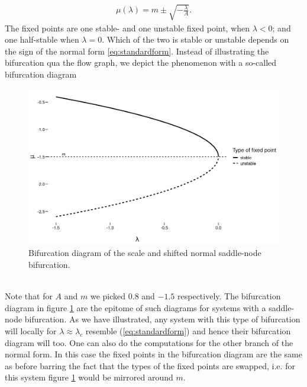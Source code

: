 \begin{align}
    \mu\left(\lambda\right) = m \pm \sqrt{-\frac{\lambda}{A}}. \label{eq:fixedPoint}
\end{align}
The fixed points are one stable- and one unstable fixed point, when $\lambda<0$; and one half-stable when $\lambda=0$. Which of the two is stable or unstable depends on the sign of the normal form \ref{eq:standardform}. Instead of illustrating the bifurcation qua the flow graph, we depict the phenomenon with a so-called bifurcation diagram\\
\begin{figure}[h]
\begin{center}
    \includegraphics[scale = .4]{figures/bifurcation_diagram.jpeg}
    \caption{Bifurcation diagram of the scale and shifted normal saddle-node bifurcation.}
    \label{figure:bifurcationDiagram}
\end{center}
\end{figure}\\
Note that for $A$ and $m$ we picked $0.8$ and $-1.5$ respectively. The bifurcation diagram in figure \ref{figure:bifurcationDiagram} are the epitome of such diagrams for systems with a saddle-node bifurcation. As we have illustrated, any system with this type of bifurcation will locally for $\lambda \approx \lambda_c$ resemble (\ref{eq:standardform}) and hence their bifurcation diagram will too. One can also do the computations for the other branch of the normal form. In this case the fixed points in the bifurcation diagram are the same as before barring the fact that the types of the fixed points are swapped, i.e. for this system figure \ref{figure:bifurcationDiagram} would be mirrored around $m$.
